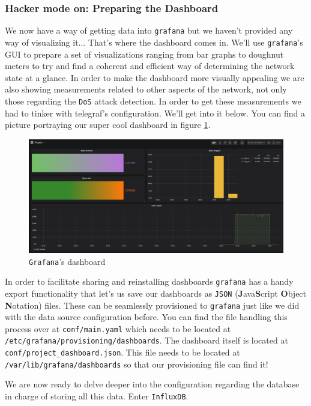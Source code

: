 \documentclass[12pt]{article}
\newcommand{\newpar} {
    \vskip 1cm
}
\begin{document}
		\subsubsection{Hacker mode on: Preparing the Dashboard}
			We now have a way of getting data into \texttt{grafana} but we haven't provided any way of visualizing it... That's where the dashboard comes in. We'll use \texttt{grafana}'s GUI to prepare a set of visualizations ranging from bar graphs to doughnut meters to try and find a coherent and efficient way of determining the network state at a glance. In order to make the dashboard more visually appealing we are also showing measurements related to other aspects of the network, not only those regarding the \texttt{DoS} attack detection. In order to get these measurements we had to tinker with telegraf's configuration. We'll get into it below. You can find a picture portraying our super cool dashboard in figure \ref{f:dashboard}.

			\begin{figure}
				\centering
				\includegraphics[width=\linewidth]{dashboard.png}
				\caption{\texttt{Grafana}'s dashboard}
				\label{f:dashboard}
			\end{figure}

			In order to facilitate sharing and reinstalling dashboards \texttt{grafana} has a handy export functionality that let's us save our dashboards as \texttt{JSON} (\textbf{J}ava\textbf{S}cript \textbf{O}bject \textbf{N}otation) files. These can be seamlessly provisioned to \texttt{grafana} just like we did with the data source configuration before. You can find the file handling this process over at \texttt{conf/main.yaml} which needs to be located at \texttt{/etc/grafana/provisioning/dashboards}. The dashboard itself is located at \texttt{conf/project\_dashboard.json}. This file needs to be located at \texttt{/var/lib/grafana/dashboards} so that our provisioning file can find it!
			\newpar
			We are now ready to delve deeper into the configuration regarding the database in charge of storing all this data. Enter \texttt{InfluxDB}.
\end{document}

